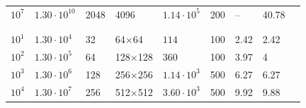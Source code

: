 \documentclass[aps, pre, onecolumn, nofootinbib, notitlepage, groupedaddress, amsfonts, amssymb, amsmath, longbibliography]{revtex4-1}
\begin{document}
\begin{table}
\begin{center}
\begin{tabularx}{\textwidth}{ X X X X X X X X X }
$10^7$	&	$1.30 \cdot 10^{10}$	&	2048	&	4096	&	$1.14 \cdot 10^5$	&	200	&	--	&	40.78	\\
\\ \hline \hline \\															
$10^1$	&	$1.30 \cdot 10^4$	&	32	&	64$\times$64	&	$114$	&	100	&	2.42	&	2.42	\\
$10^2$	&	$1.30 \cdot 10^5$	&	64	&	128$\times$128	&	$360$	&	100	&	3.97	&	4	\\
$10^3$	&	$1.30 \cdot 10^6$	&	128	&	256$\times$256	&	$1.14 \cdot 10^3$	&	500	&	6.27	&	6.27	\\
$10^4$	&	$1.30 \cdot 10^7$	&	256	&	512$\times$512	&	$3.60 \cdot 10^3$	&	500	&	9.92	&	9.88	\\
\hline															
\end{tabularx}
\end{center}
\end{table}






\end{document}
